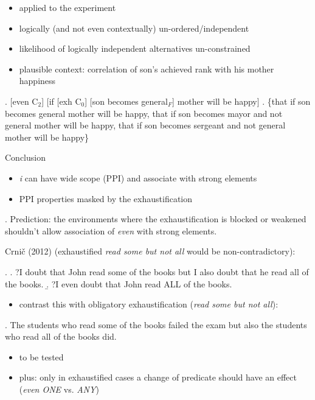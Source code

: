 \documentclass[ignorenonframetext,]{beamer}
\providecommand{\tightlist}{%
  \setlength{\itemsep}{0pt}\setlength{\parskip}{0pt}}
\begin{document}
\begin{frame}

\begin{itemize}
\tightlist
\item
  applied to the experiment
\item
  logically (and not even contextually) un-ordered/independent
\item
  likelihood of logically independent alternatives un-constrained
\item
  plausible context: correlation of son's achieved rank with his mother
  happiness
\end{itemize}

\ex. {[}even C\(_2\){]} {[}if {[}exh C\(_0\){]} {[}son becomes
general\(_F\){]} mother will be happy{]} \a. \{that if son becomes
general mother will be happy, that if son becomes mayor and not general
mother will be happy, that if son becomes sergeant and not general
mother will be happy\}

\end{frame}

\begin{frame}

Conclusion

\begin{itemize}
\tightlist
\item
  \emph{i} can have wide scope (PPI) and associate with strong elements
\item
  PPI properties masked by the exhaustification
\end{itemize}

\ex. Prediction: the environments where the exhaustification is blocked
or weakened shouldn't allow association of \emph{even} with strong
elements.

Crnič (2012) (exhaustified \Next[a] \emph{read some but not all} would
be non-contradictory):

\ex. \a. ?I doubt that John read some of the books but I also doubt that
he read all of the books. \b. ?I even doubt that John read ALL of the
books.

\end{frame}

\begin{frame}

\begin{itemize}
\tightlist
\item
  contrast this with obligatory exhaustification (\emph{read some but
  not all}):
\end{itemize}

\ex. The students who read some of the books failed the exam but also
the students who read all of the books did.

\begin{itemize}
\tightlist
\item
  to be tested
\item
  plus: only in exhaustified cases a change of predicate should have an
  effect (\emph{even ONE} vs. \emph{ANY})
\end{itemize}

\end{frame}
\end{document}
